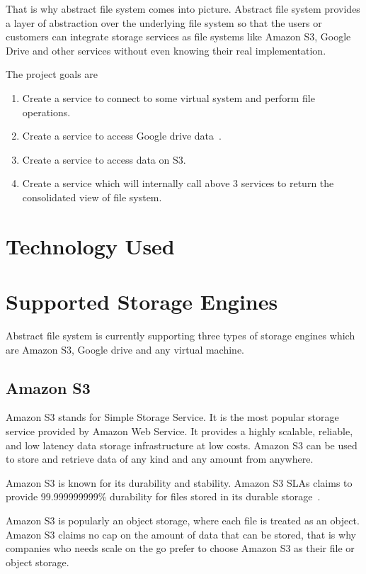 That is why abstract file system comes into picture. Abstract file system
provides a layer of abstraction over the underlying file system so that the
users or customers can integrate storage services as file systems like 
Amazon S3, Google Drive and other services without even 
knowing their real implementation.


The project goals are
\begin{enumerate}
\item	Create a service to connect to some virtual system and perform file operations.
\item	Create a service to access Google drive data~\cite{hid-sp18-420-google-drive}.
\item	Create a service to access data on S3.
\item	Create a service which will internally call above 
3 services to return the consolidated view of file system. 
\end{enumerate}

\section{Technology Used}

\section{Supported Storage Engines}
Abstract file system is currently supporting three types of storage engines
which are Amazon S3, Google drive and any virtual machine.

\subsection{Amazon S3}

Amazon S3 stands for Simple Storage Service. It is the most popular storage
service provided by Amazon Web Service. It provides a highly scalable,
reliable, and low latency data storage infrastructure at low costs. Amazon S3
can be used to store and retrieve data of any kind and any amount from anywhere.

Amazon S3 is known for its durability and stability. Amazon S3 SLAs claims to
provide 99.999999999\% durability for files stored in its durable 
storage~\cite{hid-sp18-420-amazon-S3}.

Amazon S3 is popularly an object storage, where each file is treated as an
object. Amazon S3 claims no cap on the amount of data that can be stored, that
is why companies who needs scale on the go prefer to choose Amazon S3 as their
file or object storage.

